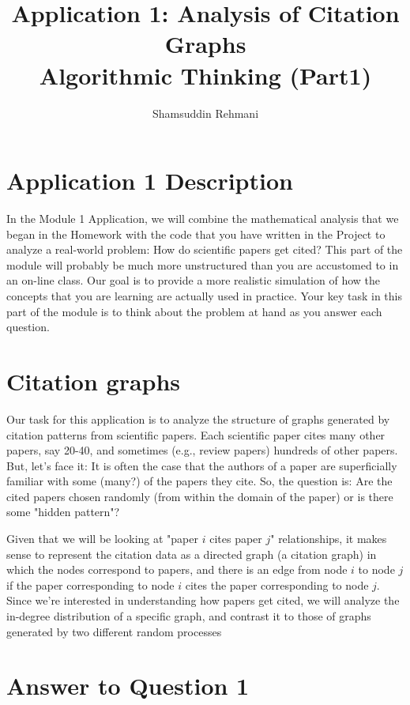 \documentclass[a4paper]{article}
\title{Application 1: Analysis of Citation Graphs \\Algorithmic Thinking (Part1)}
\author{Shamsuddin Rehmani}
\begin{document}
\sloppy
\maketitle
\section*{Application 1 Description}
In the Module 1 Application, we will combine the mathematical analysis that we began in the Homework with the code that you have written in the Project to analyze a real-world problem: How do scientific papers get cited? This part of the module will probably be much more unstructured than you are accustomed to in an on-line class. Our goal is to provide a more realistic simulation of how the concepts that you are learning are actually used in practice. Your key task in this part of the module is to think about the problem at hand as you answer each question.

\section*{Citation graphs}
Our task for this application is to analyze the structure of graphs generated by citation patterns from scientific papers. Each scientific paper cites many other papers, say 20-40, and sometimes (e.g., review papers) hundreds of other papers. But, let's face it: It is often the case that the authors of a paper are superficially familiar with some (many?) of the papers they cite. So, the question is: Are the cited papers chosen randomly (from within the domain of the paper) or is there some "hidden pattern"?

Given that we will be looking at "paper $i$ cites paper $j$" relationships, it makes sense to represent the citation data as a directed graph (a citation graph) in which the nodes correspond to papers, and there is an edge from node $i$ to node $j$ if the paper corresponding to node $i$ cites the paper corresponding to node $j$. Since we're interested in understanding how papers get cited, we will analyze the in-degree distribution of a specific graph, and contrast it to those of graphs generated by two different random processes

\section*{Answer to Question 1}
\end{document}
